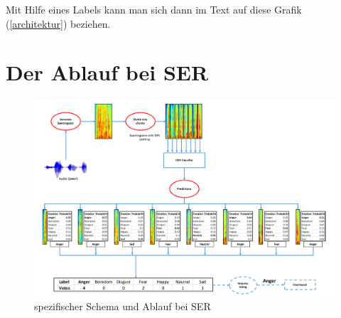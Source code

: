 Mit Hilfe eines Labels kann man sich dann im Text auf diese Grafik (\ref{architektur}) beziehen. 



\section{Der Ablauf bei SER}

\begin{figure}[ht]
	\centering
	\includegraphics[width=1\textwidth]{images/ablauf}
	\caption{\label{ablauf}spezifischer Schema und Ablauf bei SER \cite{badshah2019deep}}
\end{figure}




